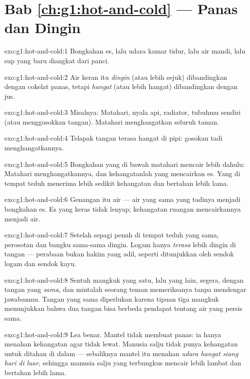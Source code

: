 \section*{Bab \ref{ch:g1:hot-and-cold} --- Panas dan Dingin}

\begin{solution}{exo:g1:hot-and-cold:1}
Bongkahan es, lalu udara kamar tidur, lalu air mandi, lalu sup yang
baru diangkat dari panci.
\end{solution}

\begin{solution}{exo:g1:hot-and-cold:2}
Air keran itu \emph{dingin} (atau lebih sejuk) dibandingkan dengan
cokelat panas, tetapi \emph{hangat} (atau lebih hangat) dibandingkan
dengan jus.
\end{solution}

\begin{solution}{exo:g1:hot-and-cold:3}
Misalnya: Matahari, nyala api, radiator, tubuhmu sendiri (atau
menggosokkan tangan). Matahari menghangatkan seluruh taman.
\end{solution}

\begin{solution}{exo:g1:hot-and-cold:4}
Telapak tangan terasa hangat di pipi: gosokan tadi menghangatkannya.
\end{solution}

\begin{solution}{exo:g1:hot-and-cold:5}
Bongkahan yang di bawah matahari mencair lebih dahulu: Matahari
menghangatkannya, dan kehangatanlah yang mencairkan es. Yang di tempat
teduh menerima lebih sedikit kehangatan dan bertahan lebih lama.
\end{solution}

\begin{solution}{exo:g1:hot-and-cold:6}
Genangan itu air --- air yang sama yang tadinya menjadi bongkahan es.
Es yang keras tidak lenyap; kehangatan ruangan mencairkannya menjadi
air.
\end{solution}

\begin{solution}{exo:g1:hot-and-cold:7}
Setelah sepagi penuh di tempat teduh yang sama, perosotan dan bangku
sama-sama dingin. Logam hanya \emph{terasa} lebih dingin di tangan ---
perabaan bukan hakim yang adil, seperti ditunjukkan oleh sendok logam
dan sendok kayu.
\end{solution}

\begin{solution}{exo:g1:hot-and-cold:8}
Sentuh mangkuk yang satu, lalu yang lain, segera, dengan tangan yang
\emph{sama}, dan mintalah seorang teman memeriksanya tanpa mendengar
jawabanmu. Tangan yang sama diperlukan karena tipuan tiga mangkuk
menunjukkan bahwa dua tangan bisa berbeda pendapat tentang air yang
persis sama.
\end{solution}

\begin{solution}{exo:g1:hot-and-cold:9}
Lea benar. Mantel tidak membuat panas: ia hanya menahan kehangatan
agar tidak lewat. Manusia salju tidak punya kehangatan untuk ditahan
di dalam --- sebaliknya mantel itu menahan \emph{udara hangat siang
hari di luar}, sehingga manusia salju yang terbungkus mencair lebih
lambat dan bertahan lebih lama.
\end{solution}
